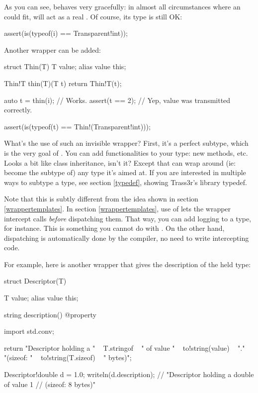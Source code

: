 As you can see,  behaves very gracefully: in almost all circumstances where an  could fit,  will act as a real . Of course, its type is still OK:

\begin{dcode}
assert(is(typeof(i) == Transparent!int));
\end{dcode}

Another wrapper can be added:

\begin{dcode}
struct Thin(T)
{
    T value;
    alias value this;
}

Thin!T thin(T)(T t)
{
    return Thin!T(t);
}

auto t = thin(i); // Works.
assert(t == 2); // Yep, value was transmitted correctly.

assert(is(typeof(t) == Thin!(Transparent!int)));
\end{dcode}

What's the use of such an invisible wrapper? First, it's a perfect subtype, which is the very goal of . You can add functionalities to your type: new methods, etc. Looks a bit like class inheritance, isn't it? Except that  can wrap around (ie: become the subtype of) any type it's aimed at. If you are interested in multiple ways to subtype a type, see section \ref{typedef}, showing Trass3r's library typedef.

Note that this is subtly different from the idea shown in section \ref{wrappertemplates}. In section \ref{wrappertemplates}, use of  lets the wrapper intercept calls \emph{before} dispatching them. That way, you can add logging to a type, for instance. This is something you cannot do with . On the other hand,  dispatching is automatically done by the compiler, no need to write intercepting code.

For example, here is another wrapper that gives the description of the held type:

\begin{dcode}
struct Descriptor(T)
{
    T value;
    alias value this;
    
    string description() @property
    {
        import std.conv;
        
        return "Descriptor holding a " ~ T.stringof
             ~ " of value " ~ to!string(value) ~ ".\n"
             ~ "(sizeof: " ~ to!string(T.sizeof) ~ " bytes)";
    }
}

Descriptor!double d = 1.0;
writeln(d.description); // "Descriptor holding a double of value 1
                        //  (sizeof: 8 bytes)"
\end{dcode}

